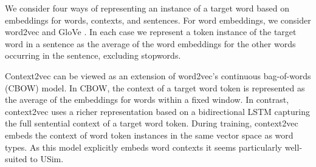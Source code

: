 \documentclass[11pt]{article}
\newcommand\glove{GloVe\xspace}
\begin{document}


We consider four ways of representing an instance of a target word
based on embeddings for words, contexts, and sentences. For word
embeddings, we consider word2vec \cite{Mikolov+:2013b} and \glove
\cite{pennington2014glove}. In each case we represent a token
instance of the target word in a sentence as the average of the word
embeddings for the other words occurring in the sentence, excluding
stopwords.


Context2vec \cite{melamud2016context2vec} can be viewed as an
extension of word2vec's continuous bag-of-words (CBOW) model. In CBOW,
the context of a target word token is represented as the average of
the embeddings for words within a fixed window. In contrast,
context2vec uses a richer representation based on a bidirectional LSTM
capturing the full sentential context of a target word token. During
training, context2vec embeds the context of word token instances in
the same vector space as word types. As this model explicitly embeds
word contexts it seems particularly well-suited to USim.
\end{document}
